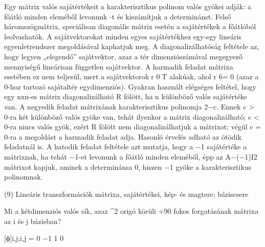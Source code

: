 \begin{frame}
  \begin{tcolorbox}[title={8/6. -Q-}]
     Egy mátrix valós sajátértékeit a karakterisztikus polinom valós gyökei adják: a főátló minden eleméből levonunk {\lambda}-t és kiszámítjuk a determinánst. Felső háromszögmátrix, speciálisan diagonális mátrix esetén a sajátértékek a főátlóból leolvashatók. A sajátvektorokat minden egyes sajátértékhez egy-egy lineáris egyenletrendszer megoldásával kaphatjuk meg. A diagonalizálhatóság feltétele az, hogy legyen „elegendő” sajátvektor, azaz a tér dimenziószámával megegyező mennyiségű lineárisan független sajátvektor. A harmadik feladat mátrixa esetében ez nem teljesül, mert a sajátvektorokr 0T alakúak, ahol r 6= 0 (azaz a 0-hoz tartozó sajátaltér egydimenziós). Gyakran használt elégséges feltétel, hogy egy nxn-es mátrix diagonalizálható R fölött, ha n különböző valós sajátértéke van. A negyedik feladat mátrixának karakterisztikus polinomja {\lambda}2−c. Ennek c > 0-ra két különböző valós gyöke van, tehát ilyenkor a mátrix diagonalizálható; c < 0-ra nincs valós gyök, ezért R fölött nem diagonalizálhatjuk a mátrixot; végül c = 0-ra a megoldást a harmadik feladat adja. Hasonló érvelés adható az ötödik feladatnál is. A hatodik feladat feltétele azt mutatja, hogy a −1 sajátértéke a mátrixnak, ha tehát −1-et levonunk a főátló minden eleméből, épp az A−(−1)I2 mátrixot kapjuk, aminek a determinánsa 0, hiszen −1 gyöke a karakterisztikus polinomnak.

  \end{tcolorbox}
\end{frame}



\begin{frame}[plain]
\begin{tcolorbox}[center, colback={myyellow}, coltext={black}, colframe={myyellow}]
    {\RHuge  (9) Lineáris transzformációk mátrixa, sajátértékei, kép- és magtere; báziscsere }
    \mmedskip
\end{tcolorbox}
\end{frame}

\begin{frame}
  \begin{tcolorbox}[title={9/1. -N-}]
    Mi a kétdimenziós valós sík, azaz ^2 origó körüli +90 fokos forgatásának mátrixa az i és j bázisban?

  \tcblower

    \mmedskip 
    
    [ϕ]i,j;i,j = 0 −1 1 0
  \end{tcolorbox}
\end{frame}


